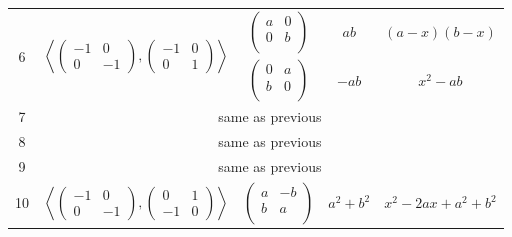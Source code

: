 \documentclass[a4paper,12pt]{amsart}
\begin{document}
\begin{table}[h]
\begin{tabular}{|c|c|c|c|c|}
			\multirow{2}{*}{6}
			& \multirow{2}{*}{
				$\left\langle 
					\begin{pmatrix}
						-1 & 0 \\ 
						0 & -1 
					\end{pmatrix}, 
					\begin{pmatrix}
						-1 & 0 \\ 
						0 & 1 
					\end{pmatrix} 
				\right\rangle$	
			}	
			&  $\begin{pmatrix}
				a & 0 \\        
				0 & b \\
			\end{pmatrix}$
			
			& $ab$ & $(a - x)(b - x)$  \\
			
			
			& & $\begin{pmatrix}
				0 & a \\        
				b & 0 \\
			\end{pmatrix}$
			& $-ab$ & $x^2 - ab$  \\
			
			\hline 
			7 & \multicolumn{4}{|c|}{same as previous} \\ 
			\hline
			8 & \multicolumn{4}{|c|}{same as previous} \\ 
			\hline
			9 & \multicolumn{4}{|c|}{same as previous} \\ 
			\hline
			
			
			\multirow{2}{*}{10} 
			& \multirow{2}{*}{
				$\left\langle 
				\begin{pmatrix}
					-1 & 0 \\ 
					0 & -1 
				\end{pmatrix}, 
				\begin{pmatrix}
					0 & 1 \\ 
					-1 & 0 
				\end{pmatrix} 
				\right\rangle$	
			}
			& $\begin{pmatrix}
				a & -b \\        
				b & a \\
			\end{pmatrix}$
			
			& $a^2 + b^2$  & $x^2 - 2ax + a^2 + b^2 $   \\ 
			

\end{tabular}
\end{table}
\end{document}
